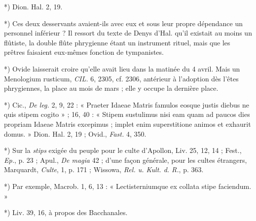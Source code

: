 \documentclass[a4paper, 11pt, oneside, polutonikogreek, french]{article}
\begin{document}
*) Dion. Hal. 2, 19.

*) Ces deux desservants avaient-ils avec eux et sous leur propre dépendance un personnel inférieur ? Il ressort du texte de Denys d'Hal. qu'il existait au moins un flûtiste, la double flûte phrygienne étant un instrument rituel, mais que les prêtres faisaient eux-mêmes fonction de tympanistes.

*) Ovide laisserait croire qu'elle avait lieu dans la matinée du 4 avril. Mais un Menologium rusticum, \emph{CIL.} 6, 2305, cf. 2306, antérieur à l'adoption dès l'êtes phrygiennes, la place au mois de mars ; elle y occupe la dernière place.

*) Cic., \emph{De leg.} 2, 9, 22 : « Praeter Idaeae Matris famulos eosque justis diebus ne quis stipem cogito » ; 16, 40 : « Stipem sustulimus nisi eam quam ad paucos dies propriam Idaeae Matris excepimus ; implet enim superstitione animos et exhaurit domus. » Dion. Hal. 2, 19 ; Ovid., \emph{Fast.} 4, 350.

*) Sur la \emph{stips} exigée du peuple pour le culte d'Apollon, Liv. 25, 12, 14 ; Fest., \emph{Ep.}, p. 23 ; Apul., \emph{De magia} 42 ; d'une façon générale, pour les cultes étrangers, Marquardt, \emph{Culte}, 1, p. 171 ; Wissowa, \emph{Rel. u. Kult. d. R.}, p. 363.

*) Par exemple, Macrob. 1, 6, 13 : « Lectisterniumque ex collata stipe faciendum. »

*) Liv. 39, 16, à propos des Bacchanales.
\end{document}
